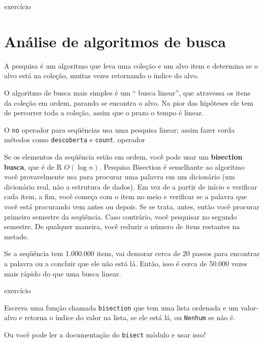 \documentclass[10pt]{book}
\begin{document}
\begin{v erbatim}
\begin{}
\begin{enumerate}
\end{enumerate}

\end{} exercício


\section{Análise de algoritmos de busca}

A pesquisa {\bf} é um algoritmo que leva uma coleção e um alvo
item e determina se o alvo está na coleção, muitas vezes
retornando o índice do alvo.

O algoritmo de busca mais simples é um `` busca linear'', que atravessa
os itens da coleção em ordem, parando se encontra o alvo.
Na pior das hipóteses ele tem de percorrer toda a coleção, assim que o prazo
o tempo é linear.

O {\tt no} operador para seqüências usa uma pesquisa linear; assim fazer corda
métodos como {\tt descoberta} e {\tt count}.
 operador

Se os elementos da seqüência estão em ordem, você pode usar um {\bf
  bisection busca}, que é de R $ O (\log n) $. Pesquisa Bisection é
semelhante ao algoritmo você provavelmente usa para procurar uma palavra em um
dicionário (um dicionário real, não a estrutura de dados). Em vez de a partir de
início e verificar cada item, a fim, você começa com o item
no meio e verificar se a palavra que você está procurando vem
antes ou depois. Se se trata, antes, então você procurar primeiro semestre
da seqüência. Caso contrário, você pesquisar no segundo semestre. De qualquer maneira,
você reduzir o número de itens restantes na metade. 

Se a seqüência tem 1.000.000 itens, vai demorar cerca de 20 passos para
encontrar a palavra ou a concluir que ele não está lá. Então, isso é cerca de 50.000
vezes mais rápido do que uma busca linear.

\begin{} exercício

Escreva uma função chamada {\tt bisection} que tem uma lista ordenada
e um valor-alvo e retorna o índice do valor
na lista, se ele está lá, ou {\tt Nenhum} se não é.


Ou você pode ler a documentação do {\tt bisect} módulo
e usar isso!


\end{}
\end{v erbatim}
\end{document}
